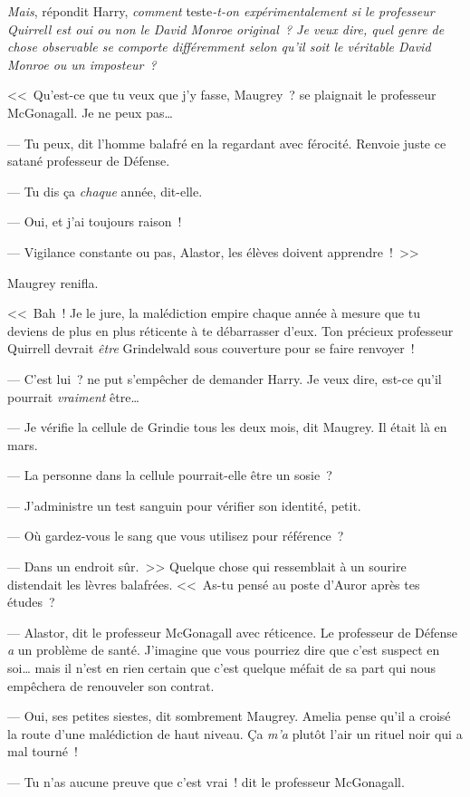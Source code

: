\emph{Mais}, répondit Harry, \emph{comment} teste\emph{-t-on expérimentalement si le professeur Quirrell est oui ou non le David Monroe original~? Je veux dire, quel genre de chose observable se comporte différemment selon qu'il soit le véritable David Monroe ou un imposteur~?}

<<~Qu'est-ce que tu veux que j'y fasse, Maugrey~? se plaignait le professeur McGonagall. Je ne peux pas…

--- Tu peux, dit l'homme balafré en la regardant avec férocité. Renvoie juste ce satané professeur de Défense.

--- Tu dis ça \emph{chaque} année, dit-elle.

--- Oui, et j'ai toujours raison~!

--- Vigilance constante ou pas, Alastor, les élèves doivent apprendre~!~>>

Maugrey renifla.

<<~Bah~! Je le jure, la malédiction empire chaque année à mesure que tu deviens de plus en plus réticente à te débarrasser d'eux. Ton précieux professeur Quirrell devrait \emph{être} Grindelwald sous couverture pour se faire renvoyer~!

--- C'est lui~? ne put s'empêcher de demander Harry. Je veux dire, est-ce qu'il pourrait \emph{vraiment} être…

--- Je vérifie la cellule de Grindie tous les deux mois, dit Maugrey. Il était là en mars.

--- La personne dans la cellule pourrait-elle être un sosie~?

--- J'administre un test sanguin pour vérifier son identité, petit.

--- Où gardez-vous le sang que vous utilisez pour référence~?

--- Dans un endroit sûr.~>> Quelque chose qui ressemblait à un sourire distendait les lèvres balafrées. <<~As-tu pensé au poste d'Auror après tes études~?

--- Alastor, dit le professeur McGonagall avec réticence. Le professeur de Défense \emph{a} un problème de santé. J'imagine que vous pourriez dire que c'est suspect en soi… mais il n'est en rien certain que c'est quelque méfait de sa part qui nous empêchera de renouveler son contrat.

--- Oui, ses petites siestes, dit sombrement Maugrey. Amelia pense qu'il a croisé la route d'une malédiction de haut niveau. Ça \emph{m'a} plutôt l'air un rituel noir qui a mal tourné~!

--- Tu n'as aucune preuve que c'est vrai~! dit le professeur McGonagall.

